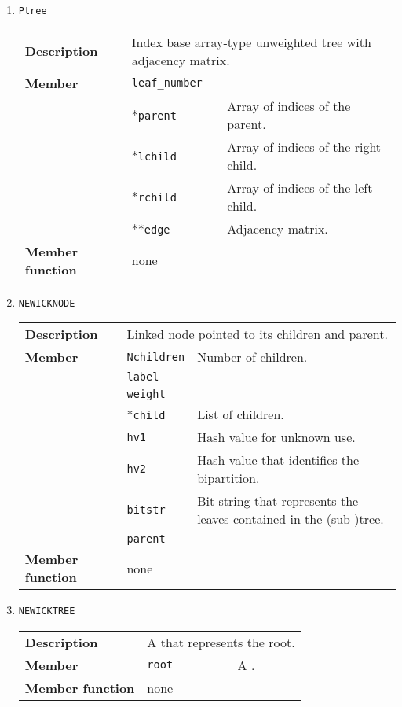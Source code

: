 \documentclass[11pt,a4paper]{article}
\newcommand{\myuline}[1]{%
	\uline{\phantom{#1}}%
	\llap{\contour{white}{#1}}%
}
\newcommand{\mrref}[1]{\texttt{#1}\label{#1}}
\newcommand{\mmemref}[2]{\texttt{#1}\label{#2#1}}
\newcommand{\mtref}[2]{\texttt{#1}\label{#2}}
\newcommand{\rref}[1]{\hyperref[#1]{\textcolor{blue}{\myuline{\texttt{#1}}}}}
\theoremstyle{definition}
\theoremstyle{definition}
\numberwithin{equation}{section}
\begin{document}
	\begin{enumerate}
		\item \mrref{Ptree}
		
			\begin{tabular}{>{\bfseries}lp{}p{}}
				Description & \multicolumn{2}{p{0.8\textwidth}}{Index base array-type unweighted tree with adjacency matrix.} \\
				Member & \mtref{leaf\_number}{leafnumber} &\\
				&*\mmemref{parent}{Ptree} & Array of indices of the parent.\\
				&*\mmemref{lchild}{Ptree} & Array of indices of the right child.\\
				&*\mmemref{rchild}{Ptree} & Array of indices of the left child.\\
				&**\mmemref{edge}{Ptree}  & Adjacency matrix.\\
				Member function& none &  \\
			\end{tabular}
		
		\item \mrref{NEWICKNODE}
		
			\begin{tabular}{>{\bfseries}lp{}p{}}
				Description & \multicolumn{2}{p{0.6\textwidth}}{Linked node pointed to its children and parent.} \\
				Member & \mmemref{Nchildren}{NEWICKNODE}  & Number of children.\\
				& \mmemref{label}{NEWICKNODE} &\\
				& \mmemref{weight}{NEWICKNODE} &\\
				& *\mmemref{child}{NEWICKNODE} & List of children.\\
				& \mmemref{hv1}{NEWICKNODE} & Hash value for unknown use.\\
				& \mmemref{hv2}{NEWICKNODE} & Hash value that identifies the bipartition.\\
				& \mmemref{bitstr}{NEWICKNODE} & Bit string that represents the leaves contained in the (sub-)tree.\\
				& \mmemref{parent}{NEWICKNODE} & \\
				Member function& none  &  \\
			\end{tabular}

		
		\item \mrref{NEWICKTREE}
		
			\begin{tabular}{>{\bfseries}lp{}p{}}
				Description & \multicolumn{2}{p{0.6\textwidth}}{A \rref{NEWICKNODE} that represents the root.} \\
				Member & \mmemref{root}{NEWICKTREE}  & A \rref{NEWICKNODE}.\\
				Member function& none  &  \\
			\end{tabular}


\end{enumerate}
\end{document}
